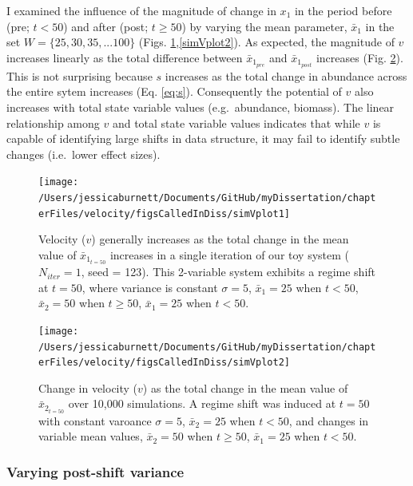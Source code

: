 \documentclass[12pt,twoside,openany]{reedthesis}
\begin{document}
I examined the influence of the magnitude of change in \(x_1\) in the period before (pre; \(t <50\)) and after (post; \(t \geq 50\)) by varying the mean parameter, \(\bar{x}_1\) in the set \(W=\{25,30,35,...100 \}\) (Figs. \ref{fig:simVplot1},\ref{simVplot2}). As expected, the magnitude of \(v\) increases linearly as the total difference between \(\bar{x}_{1_{pre}}\) and \(\bar{x}_{1_{post}}\) increases (Fig. \ref{fig:simVplot2}). This is not surprising because \(s\) increases as the total change in abundance across the entire sytem increases (Eq. \eqref{eq:s}). Consequently the potential of \(v\) also increases with total state variable values (e.g.~abundance, biomass). The linear relationship among \(v\) and total state variable values indicates that while \(v\) is capable of identifying large shifts in data structure, it may fail to identify subtle changes (i.e.~lower effect sizes).
\begin{figure}
\texttt{[image: /Users/jessicaburnett/Documents/GitHub/myDissertation/chapterFiles/velocity/figsCalledInDiss/simVplot1]} \caption{Velocity ($v$) generally increases as the total change in the mean value of $\bar{x}_{1_{t=50}}$ increases in a single iteration of our toy system ($N_{iter}=1$, seed = 123). This 2-variable system exhibits a regime shift at $t=50$, where variance is constant $\sigma = 5$, $\bar{x}_1 = 25$ when $t<50$,  $\bar{x}_2=50$ when $t\geq50$, $\bar{x}_1 = 25$ when $t <50$.}\label{fig:simVplot1}
\end{figure}
\begin{figure}
\texttt{[image: /Users/jessicaburnett/Documents/GitHub/myDissertation/chapterFiles/velocity/figsCalledInDiss/simVplot2]} \caption{Change in velocity ($v$) as the total change in the mean value of $\bar{x}_{2_{t=50}}$ over 10,000 simulations. A regime shift was induced at $t=50$ with constant varoance $\sigma = 5$, $\bar{x}_2 = 25$ when $t<50$,  and changes in variable mean values, $\bar{x}_2 = 50$ when $t \geq 50$, $\bar{x}_1 = 25$ when $t<50$.}\label{fig:simVplot2}
\end{figure}
\hypertarget{varying-post-shift-variance}{%
\subsubsection{Varying post-shift variance}\label{varying-post-shift-variance}}
\end{document}
